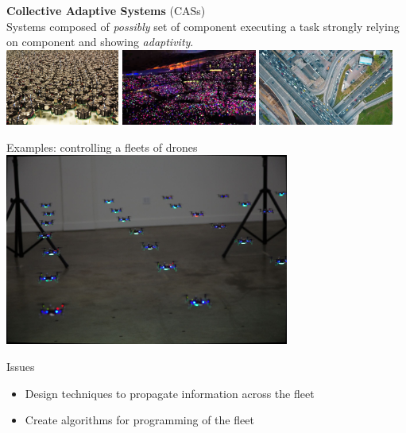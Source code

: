 \documentclass[presentation, 8pt]{beamer}\mode<presentation>{\usetheme{AMSBolognaFC}}
\begin{document}
\begin{frame}[plain,c]
	\begin{center}
	{\Huge \textbf{Collective Adaptive Systems} (CASs)}\\
	{\large Systems composed of \emph{possibly}  set of component executing a  task strongly relying on component  and showing  \emph{adaptivity}.}\\[0.3cm]
	\includegraphics[width=0.28\textwidth]{img/swarms.jpg}
	\includegraphics[width=0.333\textwidth]{img/coldplay.jpg}
	\includegraphics[width=0.333\textwidth]{img/traffic.jpg}	
	\end{center}
\end{frame}
\begin{frame}{Examples: controlling a fleets of drones}
\centering
\includegraphics[width=0.7\textwidth]{img/crazyflies}
\begin{alertblock}{Issues}
\begin{itemize}
	\item Design techniques to  propagate information across the fleet
	\item Create algorithms for  programming of the fleet
\end{itemize}
\end{alertblock}
\end{frame}
\end{document}
